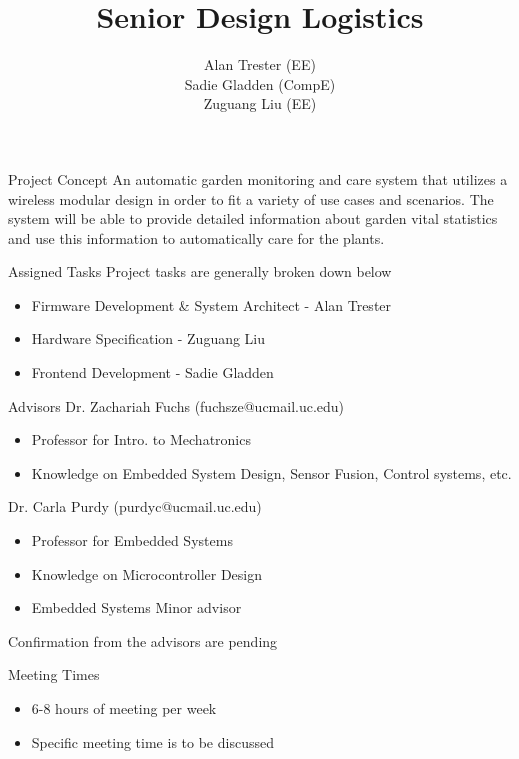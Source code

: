\documentclass{beamer}
\title{Senior Design Logistics}
\author{Alan Trester (EE) \\ Sadie Gladden (CompE) \\ Zuguang Liu (EE)}
\begin{document}
	
\begin{frame}[plain]
    \maketitle
\end{frame}
\begin{frame}{Project Concept}
	An automatic garden monitoring and care system that utilizes a wireless modular design in order to fit a variety of use cases and scenarios. The system will be able to provide detailed information about garden vital statistics and use this information to automatically care for the plants.
\end{frame}

\begin{frame}{Assigned Tasks}
  Project tasks are generally broken down below
  \begin{itemize}
    \item Firmware Development \& System Architect - Alan Trester
    \item Hardware Specification - Zuguang Liu
    \item Frontend Development - Sadie Gladden
  \end{itemize}
\end{frame}

\begin{frame}{Advisors}
	Dr. Zachariah Fuchs (fuchsze@ucmail.uc.edu)
	\begin{itemize}
		\item Professor for Intro. to Mechatronics
		\item Knowledge on Embedded System Design, Sensor Fusion, Control systems, etc.
	\end{itemize}
	Dr. Carla Purdy (purdyc@ucmail.uc.edu)
	\begin{itemize}
		\item Professor for Embedded Systems
		\item Knowledge on Microcontroller Design
		\item Embedded Systems Minor advisor
	\end{itemize}
	Confirmation from the advisors are pending
\end{frame}

\begin{frame}{Meeting Times}
	\begin{itemize}
		\item 6-8 hours of meeting per week
		\item Specific meeting time is to be discussed
	\end{itemize}
\end{frame}
\end{document}
